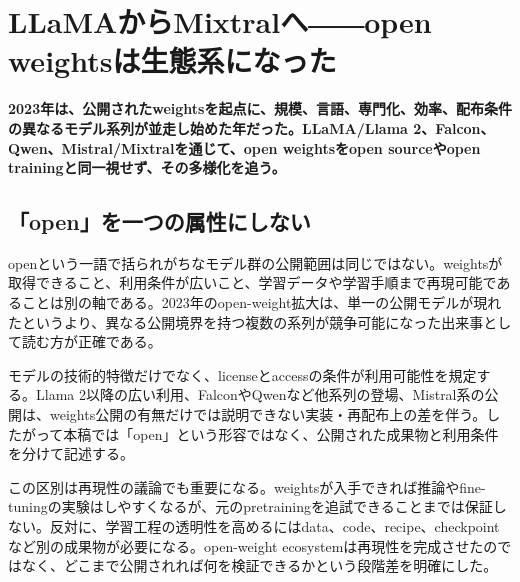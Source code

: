 \section{LLaMAからMixtralへ――open weightsは生態系になった}
\noindent\textbf{2023年は、公開されたweightsを起点に、規模、言語、専門化、効率、配布条件の異なるモデル系列が並走し始めた年だった。LLaMA/Llama 2、Falcon、Qwen、Mistral/Mixtralを通じて、open weightsをopen sourceやopen trainingと同一視せず、その多様化を追う。}\autocite{src-00c370ab2324,src-1fd43f93adcc,src-240ca564b6b8,src-3db09fede330,src-5c8e2db8871a,src-74aa7e2a7ca4,src-81f670ec1e74,src-8bdb904686fb,src-9df482e2c96c,src-b7e5243e6d59,src-bc7aba201f01,src-d4b6359bbad1,src-dd2cfa98160d,src-f0349196879e}

\subsection{「open」を一つの属性にしない}

openという一語で括られがちなモデル群の公開範囲は同じではない。weightsが取得できること、利用条件が広いこと、学習データや学習手順まで再現可能であることは別の軸である。2023年のopen-weight拡大は、単一の公開モデルが現れたというより、異なる公開境界を持つ複数の系列が競争可能になった出来事として読む方が正確である。\autocite{src-00c370ab2324,src-1fd43f93adcc,src-240ca564b6b8,src-3db09fede330,src-5c8e2db8871a,src-74aa7e2a7ca4,src-81f670ec1e74,src-8bdb904686fb,src-9df482e2c96c,src-b7e5243e6d59,src-bc7aba201f01,src-d4b6359bbad1,src-dd2cfa98160d,src-f0349196879e}


モデルの技術的特徴だけでなく、licenseとaccessの条件が利用可能性を規定する。Llama 2以降の広い利用、FalconやQwenなど他系列の登場、Mistral系の公開は、weights公開の有無だけでは説明できない実装・再配布上の差を伴う。したがって本稿では「open」という形容ではなく、公開された成果物と利用条件を分けて記述する。\autocite{src-00c370ab2324,src-1fd43f93adcc,src-240ca564b6b8,src-3db09fede330,src-5c8e2db8871a,src-74aa7e2a7ca4,src-81f670ec1e74,src-8bdb904686fb,src-9df482e2c96c,src-b7e5243e6d59,src-bc7aba201f01,src-d4b6359bbad1,src-dd2cfa98160d,src-f0349196879e}


この区別は再現性の議論でも重要になる。weightsが入手できれば推論やfine-tuningの実験はしやすくなるが、元のpretrainingを追試できることまでは保証しない。反対に、学習工程の透明性を高めるにはdata、code、recipe、checkpointなど別の成果物が必要になる。open-weight ecosystemは再現性を完成させたのではなく、どこまで公開されれば何を検証できるかという段階差を明確にした。\autocite{src-240ca564b6b8,src-3db09fede330,src-5c8e2db8871a,src-8bdb904686fb,src-9df482e2c96c,src-b7e5243e6d59,src-bc7aba201f01,src-d4b6359bbad1}


